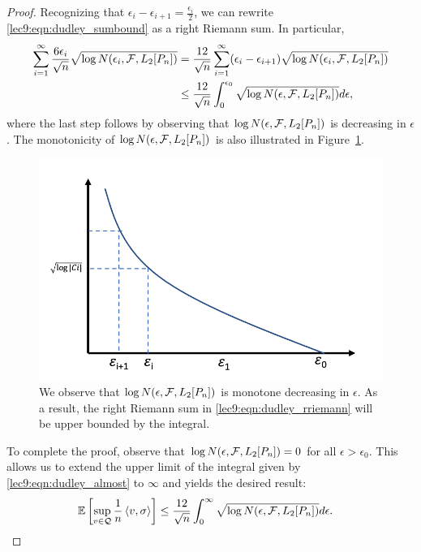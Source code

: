 \begin{proof}
    Recognizing that $\epsilon_i - \epsilon_{i + 1} = \frac{\epsilon_i}{2}$, we can rewrite \eqref{lec9:eqn:dudley_sumbound} as a right Riemann sum. In particular,
    \begin{align}
        \sum_{i = 1}^\infty \frac{6 \epsilon_i}{\sqrt{n}}\sqrt{\log N(\epsilon_i, \mathcal F, L_2[P_n])} &= \frac{12}{\sqrt{n}} \sum_{i = 1}^\infty (\epsilon_i - \epsilon_{i + 1}) \sqrt{\log N(\epsilon_i, \mathcal F, L_2[P_n])} \label{lec9:eqn:dudley_rriemann} \\
        &\le \frac{12}{\sqrt{n}} \int_{0}^{\epsilon_0} \sqrt{\log N(\epsilon, \mathcal F, L_2[P_n])} d\epsilon, \label{lec9:eqn:dudley_almost}
    \end{align}
    where the last step follows by observing that $\log N(\epsilon, \mathcal F, L_2[P_n])$ is decreasing in $\epsilon$. The monotonicity of $\log N(\epsilon, \mathcal F, L_2[P_n])$ is also illustrated in Figure~\ref{lec9:fig:chaining_riemann}.

    \begin{figure}[h!]
        \begin{center}
            \includegraphics[width=.6\textwidth]{figures/chaining_riemann.png}
        \end{center}
        \caption{We observe that $\log N(\epsilon, \mathcal F, L_2[P_n])$ is monotone decreasing in $\epsilon$. As a result, the right Riemann sum in \eqref{lec9:eqn:dudley_rriemann} will be upper bounded by the integral.}
        \label{lec9:fig:chaining_riemann}
    \end{figure}    

    To complete the proof, observe that $\log N(\epsilon, \mathcal F, L_2[P_n]) = 0$ for all $\epsilon > \epsilon_0$. This allows us to extend the upper limit of the integral given by \eqref{lec9:eqn:dudley_almost} to $\infty$ and yields the desired result:
    \begin{align}
        \operatorname*{\mathbb{E}}\left[\sup_{v \in \mathcal Q} \frac 1 n \left\langle v, \sigma\right\rangle \right] & \le \frac{12}{\sqrt{n}} \int_{0}^\infty \sqrt{\log N(\epsilon, \mathcal F, L_2[P_n])} d\epsilon.
    \end{align}
\end{proof}

